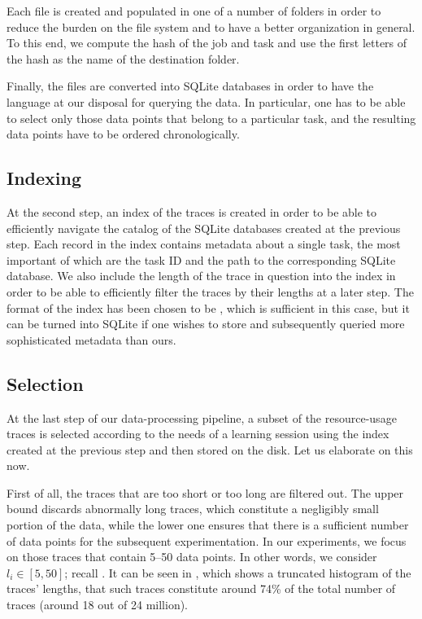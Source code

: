 Each  file is created and populated in one of a number of folders in
order to reduce the burden on the file system and to have a better organization
in general. To this end, we compute the  hash of the job and task
 and use the first letters of the hash as the name of the destination
folder.

Finally, the  files are converted into SQLite databases in order to have
the  language at our disposal for querying the data. In particular, one
has to be able to select only those data points that belong to a particular
task, and the resulting data points have to be ordered chronologically.

\subsection{Indexing} 
At the second step, an index of the traces is created in order to be able to
efficiently navigate the catalog of the SQLite databases created at the previous
step. Each record in the index contains metadata about a single task, the most
important of which are the task ID and the path to the corresponding SQLite
database. We also include the length of the trace in question into the index in
order to be able to efficiently filter the traces by their lengths at a later
step. The format of the index has been chosen to be , which is
sufficient in this case, but it can be turned into SQLite if one wishes to store
and subsequently queried more sophisticated metadata than ours.

\subsection{Selection} 
At the last step of our data-processing pipeline, a subset of the resource-usage
traces is selected according to the needs of a learning session using the index
created at the previous step and then stored on the disk. Let us elaborate on
this now.


First of all, the traces that are too short or too long are filtered out. The
upper bound discards abnormally long traces, which constitute a negligibly small
portion of the data, while the lower one ensures that there is a sufficient
number of data points for the subsequent experimentation. In our experiments, we
focus on those traces that contain 5--50 data points. In other words, we
consider $l_i \in [5, 50]$; recall . It can be seen in
, which shows a truncated histogram of the traces' lengths, that
such traces constitute around 74\% of the total number of traces (around 18 out
of 24 million).

